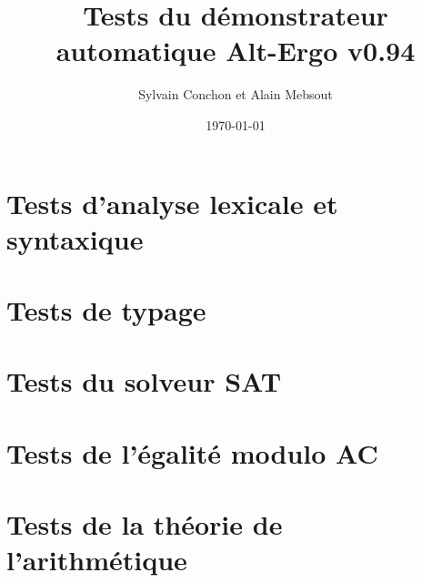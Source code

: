 \documentclass[a4paper,12pt]{article}
\title{\Large Tests du démonstrateur automatique Alt-Ergo v0.94}
\author{Sylvain Conchon et Alain Mebsout}
\date\today
\begin{document}
\maketitle

\tableofcontents

\bigskip\bigskip

\newpage

\section{Tests d'analyse lexicale et syntaxique}







\section{Tests de typage}








\section{Tests du solveur SAT}








\section{Tests de l'égalité modulo AC}








\section{Tests de la théorie de l'arithmétique}






\end{document}

